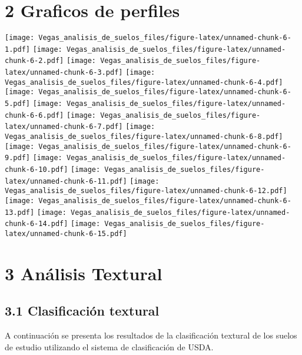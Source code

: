 \documentclass[
]{article}
\begin{document}
\hypertarget{graficos-de-perfiles}{%
\section{2 Graficos de perfiles}\label{graficos-de-perfiles}}

\texttt{[image: Vegas\_analisis\_de\_suelos\_files/figure-latex/unnamed-chunk-6-1.pdf]}
\texttt{[image: Vegas\_analisis\_de\_suelos\_files/figure-latex/unnamed-chunk-6-2.pdf]}
\texttt{[image: Vegas\_analisis\_de\_suelos\_files/figure-latex/unnamed-chunk-6-3.pdf]}
\texttt{[image: Vegas\_analisis\_de\_suelos\_files/figure-latex/unnamed-chunk-6-4.pdf]}
\texttt{[image: Vegas\_analisis\_de\_suelos\_files/figure-latex/unnamed-chunk-6-5.pdf]}
\texttt{[image: Vegas\_analisis\_de\_suelos\_files/figure-latex/unnamed-chunk-6-6.pdf]}
\texttt{[image: Vegas\_analisis\_de\_suelos\_files/figure-latex/unnamed-chunk-6-7.pdf]}
\texttt{[image: Vegas\_analisis\_de\_suelos\_files/figure-latex/unnamed-chunk-6-8.pdf]}
\texttt{[image: Vegas\_analisis\_de\_suelos\_files/figure-latex/unnamed-chunk-6-9.pdf]}
\texttt{[image: Vegas\_analisis\_de\_suelos\_files/figure-latex/unnamed-chunk-6-10.pdf]}
\texttt{[image: Vegas\_analisis\_de\_suelos\_files/figure-latex/unnamed-chunk-6-11.pdf]}
\texttt{[image: Vegas\_analisis\_de\_suelos\_files/figure-latex/unnamed-chunk-6-12.pdf]}
\texttt{[image: Vegas\_analisis\_de\_suelos\_files/figure-latex/unnamed-chunk-6-13.pdf]}
\texttt{[image: Vegas\_analisis\_de\_suelos\_files/figure-latex/unnamed-chunk-6-14.pdf]}
\texttt{[image: Vegas\_analisis\_de\_suelos\_files/figure-latex/unnamed-chunk-6-15.pdf]}

\hypertarget{anuxe1lisis-textural}{%
\section{3 Análisis Textural}\label{anuxe1lisis-textural}}

\hypertarget{clasificaciuxf3n-textural}{%
\subsection{3.1 Clasificación
textural}\label{clasificaciuxf3n-textural}}

A continuación se presenta los resultados de la clasificación textural
de los suelos de estudio utilizando el sistema de clasificación de USDA.
\end{document}
